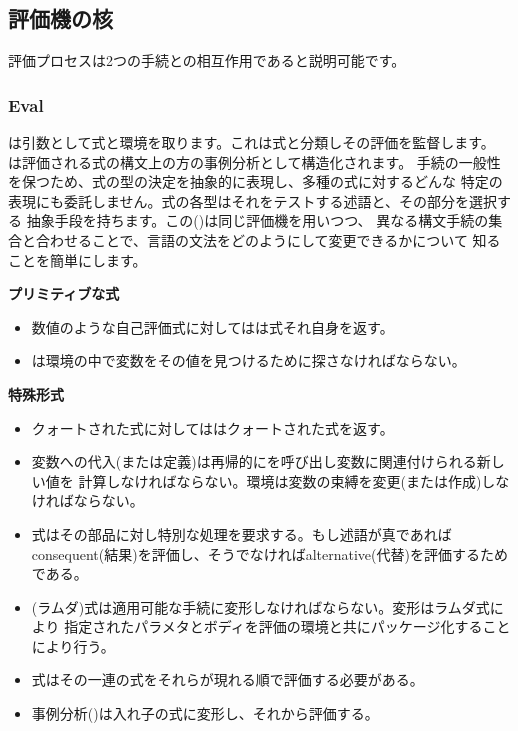 \subsection{評価機の核}
\label{Sec. 4.1.1}
\label{Section 4.1.1}



評価プロセスは2つの手続との相互作用であると説明可能です。

\subsubsection*{Eval}



は引数として式と環境を取ります。これは式と分類しその評価を監督します。
は評価される式の構文上の方の事例分析として構造化されます。
手続の一般性を保つため、式の型の決定を抽象的に表現し、多種の式に対するどんな
特定の表現にも委託しません。式の各型はそれをテストする述語と、その部分を選択する
抽象手段を持ちます。この()は同じ評価機を用いつつ、
異なる構文手続の集合と合わせることで、言語の文法をどのようにして変更できるかについて
知ることを簡単にします。

\noindent
\textbf{プリミティブな式}

\begin{itemize}

\item
数値のような自己評価式に対してはは式それ自身を返す。

\item
{}は環境の中で変数をその値を見つけるために探さなければならない。

\end{itemize}

\noindent
\textbf{特殊形式}

\begin{itemize}

\item
クォートされた式に対してははクォートされた式を返す。

\item
変数への代入(または定義)は再帰的にを呼び出し変数に関連付けられる新しい値を
計算しなければならない。環境は変数の束縛を変更(または作成)しなければならない。

\item
{}式はその部品に対し特別な処理を要求する。もし述語が真であれば
consequent(結果)を評価し、そうでなければalternative(代替)を評価するためである。

\item
{}(ラムダ)式は適用可能な手続に変形しなければならない。変形はラムダ式により
指定されたパラメタとボディを評価の環境と共にパッケージ化することにより行う。

\item
{}式はその一連の式をそれらが現れる順で評価する必要がある。

\item
事例分析()は入れ子の式に変形し、それから評価する。

\end{itemize}

